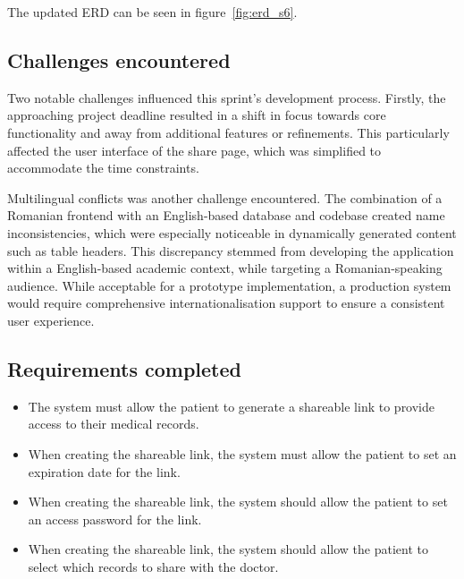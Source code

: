 The updated ERD can be seen in figure~\ref{fig:erd_s6}.

\subsection{Challenges encountered}

Two notable challenges influenced this sprint's development process. Firstly, the approaching project deadline resulted in a shift in focus towards core functionality and away from additional features or refinements. This particularly affected the user interface of the share page, which was simplified to accommodate the time constraints. 

Multilingual conflicts was another challenge encountered. The combination of a Romanian frontend with an English-based database and codebase created name inconsistencies, which were especially noticeable in dynamically generated content such as table headers. This discrepancy stemmed from developing the application within a English-based academic context, while targeting a Romanian-speaking audience. While acceptable for a prototype implementation, a production system would require comprehensive internationalisation support to ensure a consistent user experience.

\subsection{Requirements completed}

\begin{itemize}
  \item The system must allow the patient to generate a shareable link to provide access to their medical records.
  \item When creating the shareable link, the system must allow the patient to set an expiration date for the link.
  \item When creating the shareable link, the system should allow the patient to set an access password for the link.
  \item When creating the shareable link, the system should allow the patient to select which records to share with the doctor.
\end{itemize}

\noindent\begin{minipage}{\textwidth}
  \begin{center}
      \label{fig:erd_s6}
  \end{center}
\end{minipage}